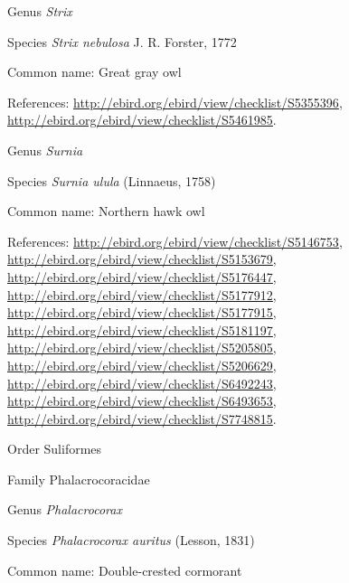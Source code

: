\documentclass[9pt, article]{memoir}
\begin{document}
\begin{multicols}{2}
\vspace{6pt}\noindent\hspace{30pt}Genus \textit{Strix}


\vspace{6pt}\noindent\hspace{36pt}Species \textit{Strix nebulosa} J. R. Forster, 1772


Common name: Great gray owl

References: 
\url{http://ebird.org/ebird/view/checklist/S5355396}, 
\url{http://ebird.org/ebird/view/checklist/S5461985}.

\vspace{6pt}\noindent\hspace{30pt}Genus \textit{Surnia}


\vspace{6pt}\noindent\hspace{36pt}Species \textit{Surnia ulula} (Linnaeus, 1758)


Common name: Northern hawk owl

References: 
\url{http://ebird.org/ebird/view/checklist/S5146753}, 
\url{http://ebird.org/ebird/view/checklist/S5153679}, 
\url{http://ebird.org/ebird/view/checklist/S5176447}, 
\url{http://ebird.org/ebird/view/checklist/S5177912}, 
\url{http://ebird.org/ebird/view/checklist/S5177915}, 
\url{http://ebird.org/ebird/view/checklist/S5181197}, 
\url{http://ebird.org/ebird/view/checklist/S5205805}, 
\url{http://ebird.org/ebird/view/checklist/S5206629}, 
\url{http://ebird.org/ebird/view/checklist/S6492243}, 
\url{http://ebird.org/ebird/view/checklist/S6493653}, 
\url{http://ebird.org/ebird/view/checklist/S7748815}.

\vspace{6pt}\noindent\hspace{18pt}Order Suliformes


\vspace{6pt}\noindent\hspace{24pt}Family Phalacrocoracidae


\vspace{6pt}\noindent\hspace{30pt}Genus \textit{Phalacrocorax}


\vspace{6pt}\noindent\hspace{36pt}Species \textit{Phalacrocorax auritus} (Lesson, 1831)


Common name: Double-crested cormorant


\end{multicols}
\end{document}
